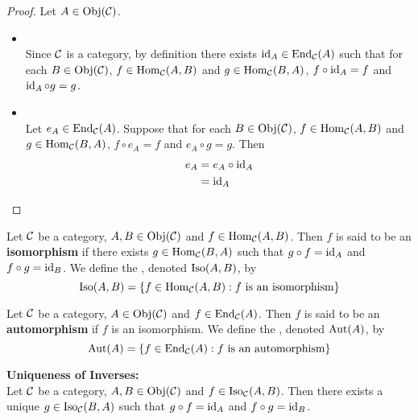 \documentclass{book}
\begin{document}
	\begin{proof}
		Let $A \in \operatorname{Obj}(\mathcal{C})$. 
		\begin{itemize}
			\item {} \\
			Since $\mathcal{C}$ is a category, by definition there exists $\operatorname{id}_A \in \operatorname{End}_{\mathcal{C}}(A)$ such that for each $B \in \operatorname{Obj}(\mathcal{C})$, $f \in \operatorname{Hom}_{\mathcal{C}}(A, B)$ and $g \in \operatorname{Hom}_{\mathcal{C}}(B, A)$, $f \circ \operatorname{id}_A = f$ and $\operatorname{id}_{A} \circ g = g$. 
			\item {} \\
			Let $e_A \in \operatorname{End}_{\mathcal{C}}(A)$. Suppose that for each $B \in \operatorname{Obj}(\mathcal{C})$, $f \in \operatorname{Hom}_{\mathcal{C}}(A, B)$ and $g \in \operatorname{Hom}_{\mathcal{C}}(B, A)$, $f \circ e_A = f$ and $e_{A} \circ g = g$. Then 
			\begin{align*}
				e_A
				& = e_A \circ \operatorname{id}_A \\
				& = \operatorname{id}_A 
			\end{align*}
		\end{itemize}
	\end{proof}
	
	\begin{defn} 
		Let $\mathcal{C}$ be a category, $A,B \in \operatorname{Obj}(\mathcal{C})$ and $f \in \operatorname{Hom}_{\mathcal{C}}(A, B)$. Then $f$ is said to be an \textbf{isomorphism} if there exists $g \in \operatorname{Hom}_{\mathcal{C}}(B, A)$ such that $g \circ f = \operatorname{id}_{A}$ and $f \circ g = \operatorname{id}_{B}$. We define the , denoted $\operatorname{Iso}(A,B)$, by 
		$$\operatorname{Iso}(A, B) = \{f \in \operatorname{Hom}_{\mathcal{C}}(A,B): f \text{ is an isomorphism}\}$$
	\end{defn}

	\begin{defn} 
		Let $\mathcal{C}$ be a category, $A \in \operatorname{Obj}(\mathcal{C})$ and $f \in \operatorname{End}_{\mathcal{C}}(A)$. Then $f$ is said to be an \textbf{automorphism} if $f$ is an isomorphism. We define the , denoted $\operatorname{Aut}(A)$, by 
		$$\operatorname{Aut}(A) = \{f \in \operatorname{End}_{\mathcal{C}}(A): f \text{ is an automorphism}\}$$
	\end{defn}
	
	\begin{ex}  \textbf{Uniqueness of Inverses:} \\
		Let $\mathcal{C}$ be a category, $A,B \in \operatorname{Obj}(\mathcal{C})$ and $f \in \operatorname{Iso}_{\mathcal{C}}(A, B)$. Then there exists a unique $g \in \operatorname{Iso}_{\mathcal{C}}(B, A)$ such that $g \circ f = \operatorname{id}_A$ and $f \circ g = \operatorname{id}_B$.
	\end{ex}
	
\end{document}
